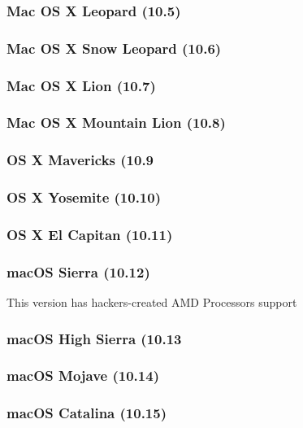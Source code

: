 \documentclass[12pt, letterpaper]{article}
\begin{document}
\subsubsection{Mac OS X Leopard (10.5)}


\subsubsection{Mac OS X Snow Leopard (10.6)}

\subsubsection{Mac OS X Lion (10.7)}

\subsubsection{Mac OS X Mountain Lion (10.8)}

\subsubsection{OS X Mavericks (10.9}

\subsubsection{OS X Yosemite (10.10)}

\subsubsection{OS X El Capitan (10.11)}

\subsubsection{macOS Sierra (10.12)}
This version has hackers-created AMD Processors support

\subsubsection{macOS High Sierra (10.13}

\subsubsection{macOS Mojave (10.14)}

\subsubsection{macOS Catalina (10.15)}
\end{document}
